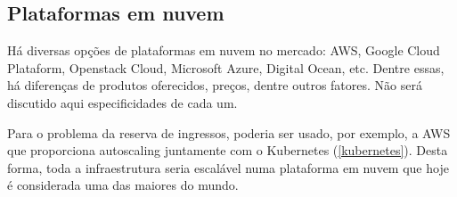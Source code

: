 
\subsection{Plataformas em nuvem}

Há diversas opções de plataformas em nuvem no mercado: AWS, Google Cloud Plataform,
Openstack Cloud, Microsoft Azure, Digital Ocean, etc. Dentre essas, há diferenças
de produtos oferecidos, preços, dentre outros fatores. Não será discutido aqui
especificidades de cada um.

Para o problema da reserva de ingressos, poderia ser usado, por exemplo, a AWS
que proporciona autoscaling \cite{aws-autoscaling} juntamente com o
Kubernetes (\autoref{kubernetes}).
Desta forma, toda a infraestrutura seria escalável numa plataforma em nuvem
que hoje é considerada uma das maiores do mundo.

%
%
%
%
%
%
%
%
%
%
%
%
%
%
%
%
%
%
%
%
